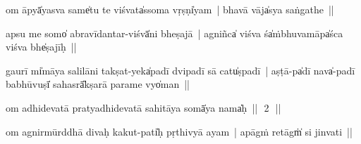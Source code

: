 \documentclass[parskip, DIV=14]{scrartcl}
\begin{document}
om āpyā̍yasva॒ same̍tu te vi॒śvata̍ssoma॒ vṛṣṇi̍yam~| bhavā॒॒ vāja̍sya saṅga॒the~||


a॒psu me॒॒ somo̍ abravīda॒ntar-viśvā̍ni bheṣa॒jā~| 
a॒gniñca̍ vi॒śva śa̍ṁbhuva॒māpa̍śca vi॒śva bhe̍ṣajīḥ~||


gau॒rī mi̍māya sali॒lāni॒ takṣa॒t-yeka̍padī dvi॒padī॒ sā catu̍ṣpadī~| 
a॒ṣṭā-pa̍dī॒ nava̍-padī babhū॒vuṣī̍ sa॒hasrā̎kṣarā para॒me vyo̍man~||


om adhidevatā pratyadhidevatā sahitāya somā̍ya॒ nama̍ḥ~||~\,2\,~||
\vspace{0.5cm}


om a॒gnirmū॒rddhā di॒vaḥ ka॒kut-pati̍ḥ pṛthi॒vyā a॒yam~| a॒pāgṁ retāgṁ̍ si jinvati~||

\end{document}
